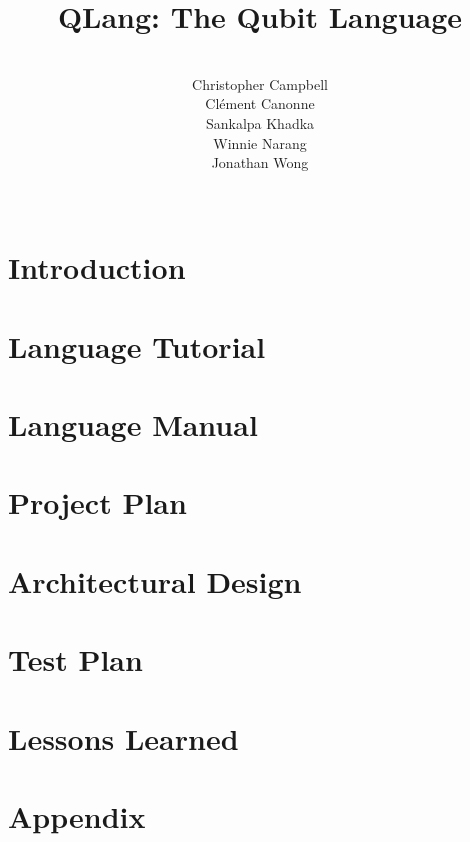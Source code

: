 \documentclass[11pt]{article}
\title{\textbf{QLang: The Qubit Language}\\ \Large}
\author{
  \\Christopher Campbell\\
  Cl\'ement Canonne\\
  Sankalpa Khadka\\
  Winnie Narang\\
  Jonathan Wong\\\\
}
\begin{document}
\maketitle
\clearpage
\tableofcontents
\clearpage
\section{Introduction}

\section{Language Tutorial}

\section{Language Manual}

\section{Project Plan}

\section{Architectural Design}

\section{Test Plan}

\section{Lessons Learned}

\section{Appendix}

\end{document}
